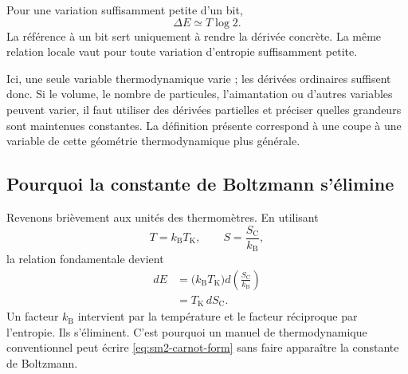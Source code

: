 Pour une variation suffisamment petite d’un bit,
\begin{equation}
 \Delta E\simeq T\log2.
 \label{eq:sm2-one-bit-energy}
\end{equation}
La référence à un bit sert uniquement à rendre la dérivée concrète. La même relation locale vaut pour toute variation d’entropie suffisamment petite.

\begin{classroomqa}
\end{classroomqa}

Ici, une seule variable thermodynamique varie ; les dérivées ordinaires suffisent donc. Si le volume, le nombre de particules, l’aimantation ou d’autres variables peuvent varier, il faut utiliser des dérivées partielles et préciser quelles grandeurs sont maintenues constantes. La définition présente correspond à une coupe à une variable de cette géométrie thermodynamique plus générale.

\subsection{Pourquoi la constante de Boltzmann s’élimine}

Revenons brièvement aux unités des thermomètres. En utilisant
\[
 T=k_{\mathrm B}T_{\mathrm K},
 \qquad
 S=\frac{S_{\mathrm C}}{k_{\mathrm B}},
\]
la relation fondamentale devient
\begin{align}
 dE
 &=\bigl(k_{\mathrm B}T_{\mathrm K}\bigr)
   d\left(\frac{S_{\mathrm C}}{k_{\mathrm B}}\right)\\
 &=T_{\mathrm K}\,dS_{\mathrm C}.
 \label{eq:sm2-carnot-form}
\end{align}
Un facteur \(k_{\mathrm B}\) intervient par la température et le facteur réciproque par l’entropie. Ils s’éliminent. C’est pourquoi un manuel de thermodynamique conventionnel peut écrire \eqref{eq:sm2-carnot-form} sans faire apparaître la constante de Boltzmann.

\begin{classroomqa}
\end{classroomqa}

